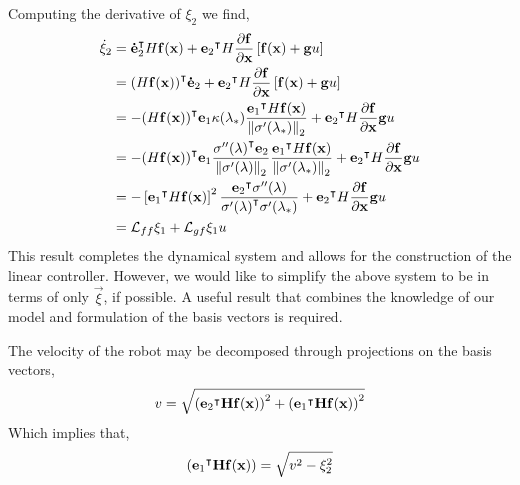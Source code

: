 \documentclass[oneside, 11pt]{book}
\begin{document}
Computing the derivative of $\xi_2$ we find,
\begin{align*}
    \dot{\xi}_2 &=  {\mathbf{\dot{e}}_2}^{\intercal}H\mathbf{f}(\mathbf{x})
                    +
                    {\mathbf{e}_2}^{\intercal}H\frac{\partial\mathbf{f}}{\partial\mathbf{x}}\left[\mathbf{f}(\mathbf{x}) + \mathbf{g}u\right]\\
                &=  {(H\mathbf{f}(\mathbf{x}))}^{\intercal}\mathbf{\dot{e}}_2
                    +
                    {\mathbf{e}_2}^{\intercal}H\frac{\partial\mathbf{f}}{\partial\mathbf{x}}\left[\mathbf{f}(\mathbf{x}) + \mathbf{g}u\right]\\
                &=  -{(H\mathbf{f}(\mathbf{x}))}^{\intercal}\mathbf{e}_1 \kappa(\lambda_*)\frac{{\mathbf{e}_1}^{\intercal}H\mathbf{f}(\mathbf{x})}{\left\|\sigma'(\lambda_*)\right\|_2}
                    +
                    {\mathbf{e}_2}^{\intercal}H\frac{\partial\mathbf{f}}{\partial\mathbf{x}}\mathbf{g} u\\
                &=  -{(H\mathbf{f}(\mathbf{x}))}^{\intercal}\mathbf{e}_1 \frac{{\sigma''(\lambda)}^{\intercal}\mathbf{e}_2}{\left\|\sigma'(\lambda)\right\|_2}\frac{{\mathbf{e}_1}^{\intercal}H\mathbf{f}(\mathbf{x})}{\left\|\sigma'(\lambda_*)\right\|_2}
                    +
                    {\mathbf{e}_2}^{\intercal}H\frac{\partial\mathbf{f}}{\partial\mathbf{x}}\mathbf{g} u\\
                &=  -\left[{\mathbf{e}_1}^{\intercal}H\mathbf{f}(\mathbf{x})\right]^2 \frac{{\mathbf{e}_2}^{\intercal}\sigma''(\lambda)}{{\sigma'(\lambda)}^{\intercal}\sigma'(\lambda_*)}
                    +
                    {\mathbf{e}_2}^{\intercal}H\frac{\partial\mathbf{f}}{\partial\mathbf{x}}\mathbf{g} u\\
                &=  \mathcal{L}_{ff}\xi_1 + \mathcal{L}_{gf}\xi_1 u
\end{align*}
This result completes the dynamical system and allows for the construction of the linear controller. However, we would like to simplify the above system to be in terms of only $\vec{\xi}$, if possible. A useful result that combines the knowledge of our model and formulation of the basis vectors is required.
\begin{lemma}
    The velocity of the robot may be decomposed through projections on the basis vectors,
    $$
        v = \sqrt{ \left({\mathbf{e}_2}^{\intercal}\mathbf{H}\mathbf{f}(\mathbf{x})\right)^2 + \left({\mathbf{e}_1}^{\intercal}\mathbf{H}\mathbf{f}(\mathbf{x})\right)^2 }
    $$
    Which implies that,
    $$
        \left({\mathbf{e}_1}^{\intercal}\mathbf{H}\mathbf{f}(\mathbf{x})\right) = \sqrt{v^2 - \xi_2^2}
    $$
\end{lemma}
\end{document}
